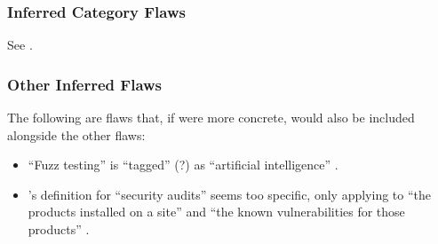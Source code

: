     \subsubsection{Inferred Category Flaws}
    See .

    

    \subsubsection{Other Inferred Flaws}
    The following are flaws that, if were more concrete, would also be
    included alongside the other flaws:
    \begin{itemize}
        \item ``Fuzz testing'' is ``tagged'' (?) as ``artificial
              intelligence'' \citep[p.~5]{IEEE2022}.
        \item \citeauthor{Gerrard2000b}'s definition for ``security
              audits'' seems too specific, only applying to ``the products
              installed on a site'' and ``the known vulnerabilities for
              those products'' \citeyearpar[p.~28]{Gerrard2000b}.
    \end{itemize}
\fi